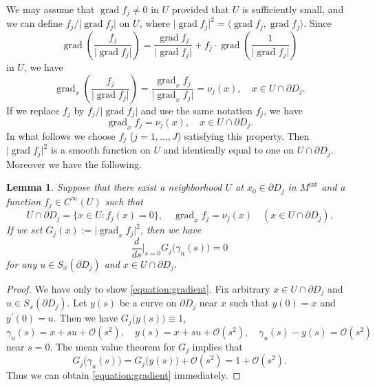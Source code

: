 \documentclass[a4paper,11pt,reqno]{amsart}
\numberwithin{equation}{section}
\newtheorem{lemma}[theorem]{Lemma}
\theoremstyle{definition}
\theoremstyle{remark}
\begin{document}
%
%
\par
%
%
We may assume that $\operatorname{grad}f_j\ne0$ in $U$ 
provided that $U$ is sufficiently small, 
and we can define $f_j/\lvert\operatorname{grad}{f_j}\rvert$ on $U$, 
where 
$\lvert\operatorname{grad}{f_j}\rvert^2=\langle\operatorname{grad}{f_j},\operatorname{grad}{f_j}\rangle$. 
Since 
%
%
$$
\operatorname{grad}
\left(\frac{f_j}{\lvert\operatorname{grad}{f_j}\rvert}\right)
=
\frac{\operatorname{grad}f_j}{\lvert\operatorname{grad}{f_j}\rvert}
+
f_j
\cdot
\operatorname{grad}
\left(\frac{1}{\lvert\operatorname{grad}{f_j}\rvert}\right)
$$
%
%
in $U$, we have 
%
%
$$
\operatorname{grad}_x
\left(\frac{f_j}{\lvert\operatorname{grad}{f_j}\rvert}\right)
=
\frac{\operatorname{grad}_xf_j}{\lvert\operatorname{grad}_x{f_j}\rvert}
=
\nu_j(x),
\quad
x \in U{\cap}\partial{D_j}. 
$$ 
%
%
If we replace $f_j$ by $f_j/\lvert\operatorname{grad}f_j\rvert$ and use the same notation $f_j$, we have 
%
%
$$
\operatorname{grad}_xf_j=\nu_j(x),
\quad
x \in U\cap\partial{D_j}.
$$
%
%
In what follows we choose $f_j$ ($j=1,\dotsc,J$) satisfying this property. 
Then $\lvert\operatorname{grad}f_j\rvert^2$ is a smooth function on $U$ 
and identically equal to one on $U{\cap}\partial{D_j}$. Moreover we have the following. 
%
%
\begin{lemma}
\label{theorem:gradient}
Suppose that there exist a neighborhood $U$ at 
$x_0 \in \partial{D_j}$ in $M^\text{int}$ and a function $f_j \in C^\infty(U)$ such that
%
% 
$$
U{\cap}\partial{D_j}
=
\{x \in U : f_j(x)=0\},
\quad
\operatorname{grad}_xf_j=\nu_j(x)
\quad
(x \in U{\cap}\partial{D_j}).
$$
%
%
If we set $G_j(x):=\lvert\operatorname{grad}_xf_j\rvert^2$, 
then we have 
%
%
\begin{equation}
\frac{d}{ds}\bigg\vert_{s=0}
G_j\bigl(\gamma_u(s)\bigr)
=0
\label{equation:gradient}
\end{equation}
%
%
for any $u \in S_x(\partial{D_j})$ and $x \in U{\cap}\partial{D_j}$.   
\end{lemma}
%
%
\begin{proof} 
We have only to show \eqref{equation:gradient}. 
Fix arbitrary $x \in U{\cap}\partial{D_j}$ and $u \in S_x(\partial{D_j})$. 
Let $y(s)$ be a curve on $\partial{D_j}$ near $x$ such that $y(0)=x$ and $y^\prime(0)=u$.  
Then we have $G_j\bigl(y(s)\bigr)\equiv1$, 
%
%
$$
\gamma_u(s)=x+su+\mathcal{O}(s^2), 
\quad
y(s)=x+su+\mathcal{O}(s^2), 
\quad
\gamma_u(s)-y(s)=\mathcal{O}(s^2)
$$
%
%
near $s=0$. The mean value theorem for $G_j$ implies that 
%
%
$$
G_j\bigl(\gamma_u(s)\bigr)
=
G_j\bigl(y(s)\bigr)+\mathcal{O}(s^2)
=
1+\mathcal{O}(s^2). 
$$
%
%
Thus we can obtain \eqref{equation:gradient} immediately. 
\end{proof}
\end{document}
